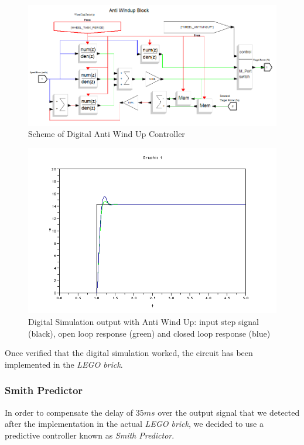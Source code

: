 \begin{figure}[H]
\center
  \includegraphics[scale=0.51]{FIGURES_3/Anti_Windup_Block.png}
  \caption[SOSModel]{Scheme of Digital Anti Wind Up Controller}
  \label{fig:antiwindup}
\end{figure}
\large
\begin{figure}[H]
\center
  \includegraphics[scale=0.51]{FIGURES_3/Simulation_yesAW_noSP.png}
  \caption[SOSModel]{Digital Simulation output with Anti Wind Up: input step signal (black), open loop response (green) and closed loop response (blue)}
  \label{fig:sim_yesAW_noSP}
\end{figure}

Once verified that the digital simulation worked, the circuit has been implemented in the \textit{LEGO brick}.

\subsubsection{Smith Predictor}

In order to compensate the delay of $35ms$ over the output signal that we detected after the implementation in the actual \textit{LEGO brick}, we decided to use a predictive controller known as \textit{Smith Predictor}.

